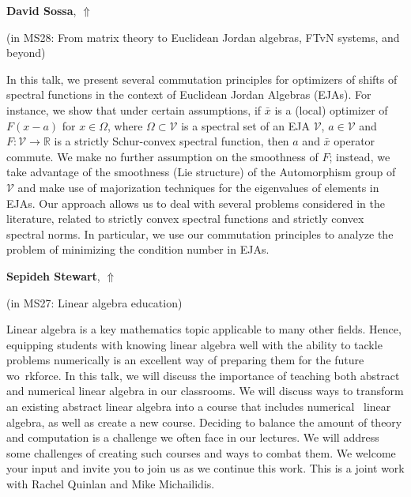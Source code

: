 \documentclass[ILAS2025-program.tex]{subfiles}
\begin{document}
\hypertarget{down0386}{}\begin{ilasabstract}
    
\textbf{David Sossa},  \hfill \hyperlink{up0386}{$\Uparrow$}
    
    
(in {\color{mstitle}MS28: From matrix theory to Euclidean Jordan algebras, FTvN systems, and beyond})
        
\mtskip
    In this talk, we present several commutation principles for optimizers of shifts of spectral functions in the context of Euclidean Jordan Algebras (EJAs). For instance, we show that under certain assumptions, if $\bar x$ is a (local) optimizer of $F(x-a)$ for $x\in\Omega$, where $\Omega\subset \mathcal V$ is a spectral set of an EJA $\mathcal V$, $a\in \mathcal V$ and $F:\mathcal V\rightarrow \mathbb{R}$ is a strictly Schur-convex spectral function, then $a$ and $\bar x$ operator commute. We make no further assumption on the smoothness of $F$; instead, we take advantage of the smoothness (Lie structure) of the Automorphism group of $\mathcal V$ and make use of majorization techniques for the eigenvalues of elements in EJAs. Our approach allows us to deal with several problems considered in the literature, related to strictly convex spectral functions and strictly convex spectral norms. In particular, we use our commutation principles to analyze the problem of minimizing the condition number in EJAs.
\end{ilasabstract}
    

\hypertarget{down0334}{}\begin{ilasabstract}
    
\textbf{Sepideh Stewart},  \hfill \hyperlink{up0334}{$\Uparrow$}
    
    
(in {\color{mstitle}MS27: Linear algebra education})
        
\mtskip
    Linear algebra is a key mathematics topic applicable to many other fields. Hence, equipping students with knowing linear algebra well with the ability to tackle problems numerically is an excellent way of preparing them for the future wo\
rkforce.  In this talk, we will discuss the importance of teaching both abstract and numerical linear algebra in our classrooms. We will discuss ways to transform an existing abstract linear algebra into a course that includes numerical \
linear algebra, as well as create a new course. Deciding to balance the amount of theory and computation is a challenge we often face in our lectures.  We will address some challenges of creating such courses and ways to combat them.
We welcome your input and invite you to join us as we continue this work. This is a joint work with Rachel Quinlan and Mike Michailidis.
\end{ilasabstract}
    
\end{document}
